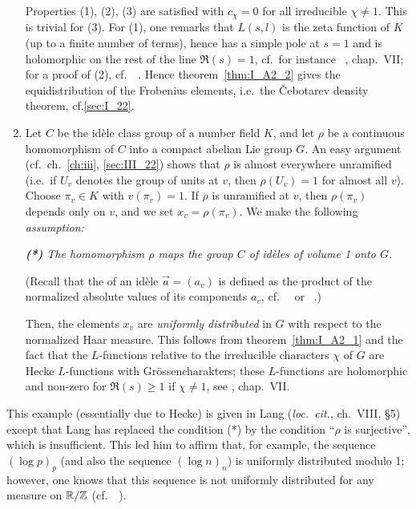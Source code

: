 \begin{subappendices}
\begin{ex}
\begin{enumerate}[series=ex_IA3]
	Properties (1), (2), (3) are satisfied with $c_\chi = 0$ for all
	irreducible $\chi \ne 1$. This is trivial for (3). For (1), one remarks
	that $L(s,l)$ is the zeta function of $K$ (up to a finite number of
	terms), hence has a simple pole at $s = 1$ and is holomorphic on the
	\dpage
	rest of the line $\Re(s) = 1$, cf.\ for instance
	\citeauthor{13}~\cite{13}, chap.\ VII; for a proof of (2), cf.\
	\citeauthor{1}~\cite[121]{1}.  Hence theorem~\ref{thm:I_A2_2} gives the
	equidistribution of the Frobenius elements, i.e.\ the \v Cebotarev
	density theorem, cf.\~\ref{sec:I_22}.

\item Let $C$ be the idèle class group of a number field $K$, and let $\rho$ be
	a continuous homomorphism of $C$ into a compact abelian Lie group $G$.
	An easy argument (cf.\ ch.~\ref{ch:iii}, \ref{sec:III_22}) shows that
	$\rho$ is almost everywhere unramified (i.e.\, if $U_v$ denotes the
	group of units at $v$, then $\rho(U_v) = 1$ for almost all $v$). Choose
	$\pi_v \in K$ with $v(\pi_v) = 1$. If $\rho$ is unramified at $v$, then
	$\rho(\pi_v)$ depends only on $v$, and we set $x_v = \rho(\pi_v)$. We
	make the following \emph{assumption:}
	\begin{displayquote}
		\slshape
		\textbf{(*)}
		The homomorphism $\rho$ maps the group $C$ of idèles of
		volume 1 onto $G$.
	\end{displayquote}
	(Recall that the  of an idèle $\vec a = (a_v)$ is
	defined as the product of the normalized absolute values of its
	components $a_v$, cf.\ \citeauthor{13}~\cite{13} or
	\citeauthor{44}~\cite{44}.)

	Then, the elements $x_v$ are \emph{uniformly distributed} in $G$ with
	respect to the normalized Haar measure. This follows from
	theorem~\ref{thm:I_A2_1} and the fact that the $L$-functions relative
	to the irreducible characters $\chi$ of $G$ are Hecke $L$-functions
	with Grössencharakters; these $L$-functions are holomorphic and
	non-zero for $\Re(s) \ge 1$ if $\chi \ne 1$, see \cite{13}, chap.\ VII.
\end{enumerate}
\end{ex}

\begin{obs}
This example (essentially due to Hecke) is given in Lang
(\emph{loc.\ cit.}, ch.~VIII, \S 5) except that Lang has replaced the condition
(*) by the condition ``$\rho$ is surjective'', which is insufficient. This
led him to affirm that, for example, the sequence $(\log p)_p$ (and also
the sequence $(\log n)_n$) is uniformly distributed modulo 1; however,
\dpage
one knows that this sequence is not uniformly distributed for any
measure on $\mathbb{R}/\mathbb{Z}$ (cf.\ \citeauthor{22}~\cite[179-180]{22}).
\end{obs}


\end{subappendices}
